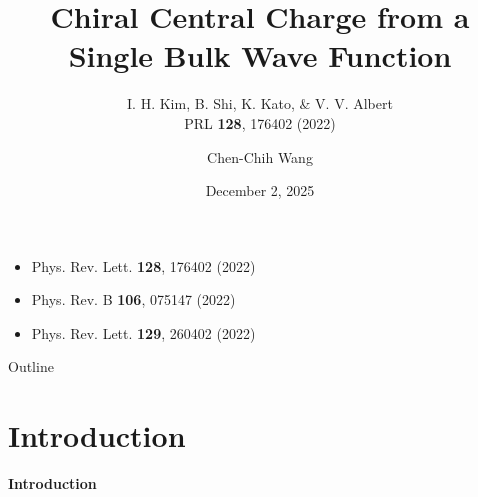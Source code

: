 \documentclass[professionalfont]{beamer}
\title{\textbf{Chiral Central Charge from a Single Bulk Wave Function}}
\subtitle{I. H. Kim, B. Shi, K. Kato, \& V. V. Albert \\ PRL \textbf{128}, 176402  (2022)}
\author{Chen-Chih Wang}
\institute{NTHU}
\date{December 2, 2025}
\begin{document}
\begin{frame}
    \titlepage
\end{frame}
\begin{frame}
    \begin{itemize}
        \item Phys. Rev. Lett. \textbf{128}, 176402 (2022)
        \item Phys. Rev. B \textbf{106}, 075147 (2022)
        \item Phys. Rev. Lett. \textbf{129}, 260402 (2022)
    \end{itemize}
\end{frame}
\begin{frame}{Outline}
   \tableofcontents
\end{frame}
{
\section{Introduction}
\begin{frame}
    \centering
    \huge
    \textbf{Introduction}
\end{frame}
}
\end{document}
